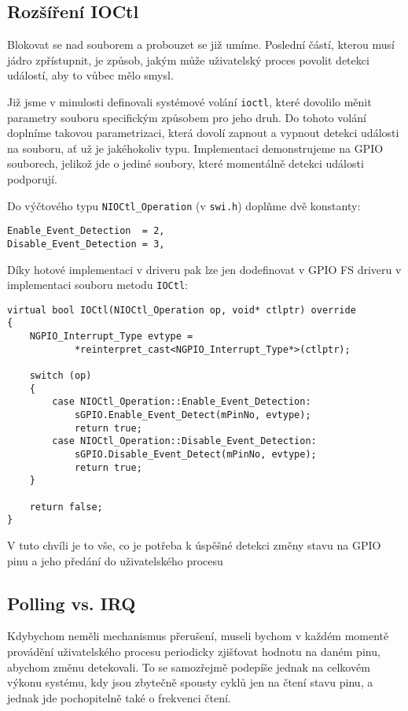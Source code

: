 \documentclass{article}
\begin{document}
\subsection{Rozšíření IOCtl}

Blokovat se nad souborem a probouzet se již umíme. Poslední částí, kterou musí jádro zpřístupnit, je způsob, jakým může uživatelský proces povolit detekci událostí, aby to vůbec mělo smysl.

Již jsme v minulosti definovali systémové volání \texttt{ioctl}, které dovolilo měnit parametry souboru specifickým způsobem pro jeho druh. Do tohoto volání doplníme takovou parametrizaci, která dovolí zapnout a vypnout detekci události na souboru, ať už je jakéhokoliv typu. Implementaci demonstrujeme na GPIO souborech, jelikož jde o jediné soubory, které momentálně detekci události podporují.

Do výčtového typu \texttt{NIOCtl\_Operation} (v \texttt{swi.h}) doplňme dvě konstanty:
\begin{lstlisting}
Enable_Event_Detection  = 2,
Disable_Event_Detection = 3,
\end{lstlisting}

Díky hotové implementaci v driveru pak lze jen dodefinovat v GPIO FS driveru v implementaci souboru metodu \texttt{IOCtl}:
\begin{lstlisting}
virtual bool IOCtl(NIOCtl_Operation op, void* ctlptr) override
{
	NGPIO_Interrupt_Type evtype = 
			*reinterpret_cast<NGPIO_Interrupt_Type*>(ctlptr);
	
	switch (op)
	{
		case NIOCtl_Operation::Enable_Event_Detection:
			sGPIO.Enable_Event_Detect(mPinNo, evtype);
			return true;
		case NIOCtl_Operation::Disable_Event_Detection:
			sGPIO.Disable_Event_Detect(mPinNo, evtype);
			return true;
	}
	
	return false;
}
\end{lstlisting}

V tuto chvíli je to vše, co je potřeba k úspěšné detekci změny stavu na GPIO pinu a jeho předání do uživatelského procesu

\subsection{Polling vs. IRQ}

Kdybychom neměli mechanismus přerušení, museli bychom v každém momentě provádění uživatelského procesu periodicky zjišťovat hodnotu na daném pinu, abychom změnu detekovali. To se samozřejmě podepíše jednak na celkovém výkonu systému, kdy jsou zbytečně  spousty cyklů jen na čtení stavu pinu, a jednak jde pochopitelně také o frekvenci čtení.
\end{document}
